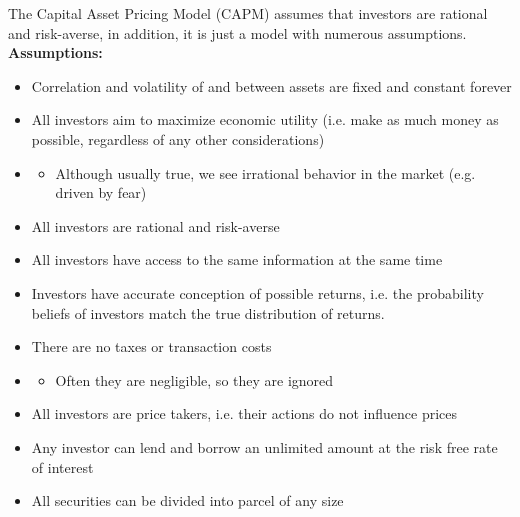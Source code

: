 \begin{theorem}
    The Capital Asset Pricing Model (CAPM) assumes that investors are rational and risk-averse, in addition, it is just a model with numerous assumptions.\\
    \textbf{Assumptions:}
    \begin{itemize}
        \item Correlation and volatility of and between assets are fixed and constant forever
        \item All investors aim to maximize economic utility (i.e. make as much money as possible, regardless of any other considerations)
        \item[] \begin{itemize}
                  \item Although usually true, we see irrational behavior in the market (e.g. driven by fear)
              \end{itemize}
        \item All investors are rational and risk-averse
        \item All investors have access to the same information at the same time
        \item Investors have accurate conception of possible returns, i.e. the probability beliefs of investors match the true distribution of returns.
        \item There are no taxes or transaction costs
        \item[] \begin{itemize}
                  \item Often they are negligible, so they are ignored
              \end{itemize}
        \item All investors are price takers, i.e. their actions do not influence prices
        \item Any investor can lend and borrow an unlimited amount at the risk free rate of interest
        \item All securities can be divided into parcel of any size
    \end{itemize}
\end{theorem}

